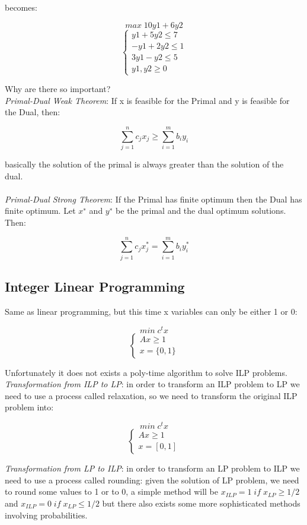 becomes:

\[max \; 10y1 + 6y2\]
\[\begin{cases} y1+5y2 \leq 7 \\ -y1 + 2y2 \leq 1 \\ 3y1-y2 \leq 5 \\y1,y2 \geq 0 \end{cases}\]

Why are there so important?\\

\emph{Primal-Dual Weak Theorem}: If x is feasible for the Primal and y is feasible for the Dual, then:

\[ \sum^{n}_{j=1} c_{j}x_{j} \geq \sum^{m}_{i=1}b_{i}y_{i}\]

basically the solution of the primal is always greater than the solution of the dual.\\\\
\emph{Primal-Dual Strong Theorem}: If the Primal has finite optimum then the Dual has finite optimum. Let $x^{∗}$ and $y^{∗}$ be the primal and the dual optimum solutions. Then:

\[ \sum^{n}_{j=1} c_{j}x_{j}^{*} = \sum^{m}_{i=1}b_{i}y_{i}^{*}\]

\subsection{Integer Linear Programming}

Same as linear programming, but this time x variables can only be either 1 or 0:

\[min \; c^{t}x\]
\[\begin{cases} Ax \geq 1 \\ x = \{0,1\} \end{cases}\]

Unfortunately it does not exists a poly-time algorithm to solve ILP problems.\\

\emph{Transformation from ILP to LP}: in order to transform an ILP problem to LP we need to use a process called relaxation, so we need to transform the original ILP problem into:

\[min \; c^{t}x\]
\[\begin{cases} Ax \geq 1 \\ x = [0,1] \end{cases}\]

\emph{Transformation from LP to ILP}: in order to transform an LP problem to ILP we need to use a process called rounding: given the solution of LP problem, we need to round some values to 1 or to 0, a simple method will be $x_{ILP} = 1 \; if \; x_{LP} \geq 1/2$ and $x_{ILP} = 0 \; if \; x_{LP} \leq 1/2$ but there also exists some more sophisticated methods involving probabilities.\\


